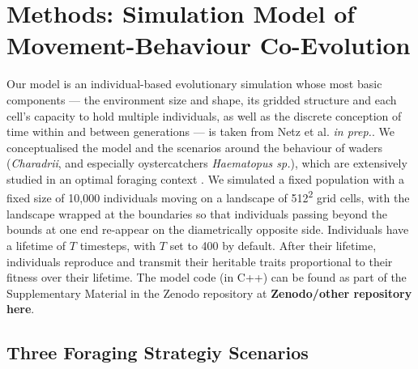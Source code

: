 \documentclass[11pt]{article}
\begin{document}
\section{Methods: Simulation Model of Movement-Behaviour Co-Evolution}

Our model is an individual-based evolutionary simulation whose most basic components --- the environment size and shape, its gridded structure and each cell's capacity to hold multiple individuals, as well as the discrete conception of time within and between generations --- is taken from Netz et al. \textit{in prep.}.
We conceptualised the model and the scenarios around the behaviour of waders (\textit{Charadrii}, and especially oystercatchers \textit{Haematopus sp.}), which are extensively studied in an optimal foraging context \citep[e.g. ][]{vahl2005, vahl2005a, vahl2005b, ENS1990219}.
We simulated a fixed population with a fixed size of 10,000 individuals moving on a landscape of 512\textsuperscript{2} grid cells, with the landscape wrapped at the boundaries so that individuals passing beyond the bounds at one end re-appear on the diametrically opposite side.
Individuals have a lifetime of $T$ timesteps, with $T$ set to 400 by default.
After their lifetime, individuals reproduce and transmit their heritable traits proportional to their fitness over their lifetime.
The model code (in C++) can be found as part of the Supplementary Material in the Zenodo repository at \textbf{Zenodo/other repository here}.

\subsection{Three Foraging Strategiy Scenarios}
\end{document}
